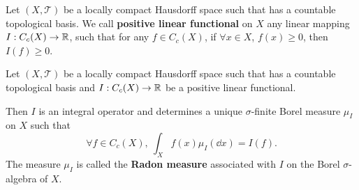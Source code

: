 \begin{definitionenv}
    Let $(X,\mathscr{T})$ be a locally compact Hausdorff space such that has a countable topological basis.
    We call \textbf{positive linear functional} on $X$ any linear mapping $I : C_c (X) \rightarrow \mathbb{R}$,
    such that for any $f \in C_c(X)$,
    if $\forall x \in X$, $f(x) \ge 0$, then $I(f) \ge 0$.
\end{definitionenv}

\begin{theoremenv}
    Let $(X,\mathscr{T})$ be a locally compact Hausdorff space such that has a countable topological basis and $I : C_c(X) \rightarrow \mathbb{R}$ be a positive linear functional.
    
    \quad Then $I$ is an integral operator and determines a unique $\sigma$-finite Borel measure $\mu_{I}$ on $X$ such that
    $$\forall f \in C_c(X), \ \int_{X} f(x) \mu_{I} (\dd x) = I(f).$$
    The measure $\mu_{I}$ is called the \textbf{Radon measure} associated with $I$ on the Borel $\sigma$-algebra of $X$.
\end{theoremenv}

